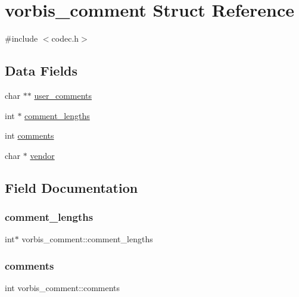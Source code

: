 \hypertarget{structvorbis__comment}{}\section{vorbis\+\_\+comment Struct Reference}
\label{structvorbis__comment}


{\ttfamily \#include $<$codec.\+h$>$}

\subsection*{Data Fields}
\begin{DoxyCompactItemize}
\item 
char $\ast$$\ast$ \hyperlink{structvorbis__comment_ac45cb70542b0be5ce3e8d85db6df48ec}{user\+\_\+comments}
\item 
int $\ast$ \hyperlink{structvorbis__comment_a4698d400a859e9338a5828ead97cacdf}{comment\+\_\+lengths}
\item 
int \hyperlink{structvorbis__comment_aa338208fb0f485b3818832a7d07dbe92}{comments}
\item 
char $\ast$ \hyperlink{structvorbis__comment_a1f25158a2c045a6dd8a13b33b34612d3}{vendor}
\end{DoxyCompactItemize}


\subsection{Field Documentation}
\mbox{\label{structvorbis__comment_a4698d400a859e9338a5828ead97cacdf}} 
\subsubsection{\texorpdfstring{comment\+\_\+lengths}{comment\_lengths}}
{\footnotesize\ttfamily int$\ast$ vorbis\+\_\+comment\+::comment\+\_\+lengths}

\mbox{\label{structvorbis__comment_aa338208fb0f485b3818832a7d07dbe92}} 
\subsubsection{\texorpdfstring{comments}{comments}}
{\footnotesize\ttfamily int vorbis\+\_\+comment\+::comments}

